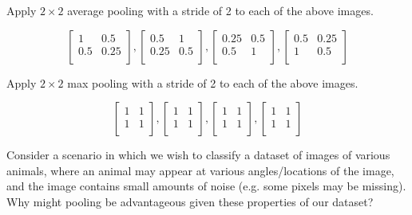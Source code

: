 Apply $2 \times 2$ average pooling with a stride of 2 to each of the above images.

\begin{subsolution}
  $$
  \begin{bmatrix}
    1 & 0.5 \\
    0.5 & 0.25 \\
  \end{bmatrix},
  \begin{bmatrix}
    0.5 & 1 \\
    0.25 & 0.5 \\
  \end{bmatrix},
  \begin{bmatrix}
    0.25 & 0.5 \\
    0.5 & 1 \\
  \end{bmatrix},
  \begin{bmatrix}
    0.5 & 0.25 \\
    1 & 0.5 \\
  \end{bmatrix}
  $$
\end{subsolution}

\problem[3]

Apply $2 \times 2$ max pooling with a stride of 2 to each of the above images.

\begin{subsolution}
  $$
  \begin{bmatrix}
    1 & 1 \\
    1 & 1 \\
  \end{bmatrix},
  \begin{bmatrix}
    1 & 1 \\
    1 & 1 \\
  \end{bmatrix},
  \begin{bmatrix}
    1 & 1 \\
    1 & 1 \\
  \end{bmatrix},
  \begin{bmatrix}
    1 & 1 \\
    1 & 1 \\
  \end{bmatrix}
  $$
\end{subsolution}

\problem[4]

Consider a scenario in which we wish to classify a dataset of images of various animals, where an animal may appear at various angles/locations of the image, and the image contains small amounts of noise (e.g. some pixels may be missing). Why might pooling be advantageous given these properties of our dataset?

